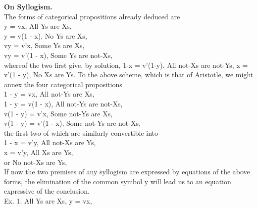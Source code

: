 \documentclass{article}
\begin{document}
{{{{\large{\bf On Syllogism.}\vspace{.1in}\\
\normalsize
The forms of categorical propositions already deduced are\vspace{.1in}\\
\hspace*{.2in}y = vx, All Ys are Xs,\\
\hspace*{.2in}y = v(1 - x), No Ys are Xs,\\
\hspace*{.2in}vy = v'x, Some Ys are Xs,\\
\hspace*{.2in}vy = v'(1 - x), Some Ys are not-Xs,\\
whereof the two first give, by solution, 1-x = v'(1-y). All not-Xs are not-Ys,
x = v'(1 - y), No Xs are Ys. To the above scheme, which is that of Aristotle,
we might annex the four categorical propositions\vspace{.1in}\\
\hspace*{.2in} 1 - y = vx, All not-Ys are Xs,\\
\hspace*{.2in} 1 - y = v(1 - x), All not-Ys are not-Xs,\\
\hspace*{.2in} v(1 - y) = v'x, Some not-Ys are Xs,\\
\hspace*{.2in} v(1 - y) = v'(1 - x), Some not-Ys are not-Xs,\\
the first two of which are similarly convertible into\vspace{.1in}\\
\hspace*{.2in} 1 - x = v'y, All not-Xs are Ys,\\
\hspace*{.2in}x = v'y, All Xs are Ys,\\
\hspace*{.5in}or No not-Xs are Ys,\vspace{.1in}\\
\hspace*{.1in}If now the two premises of any syllogism are expressed by equations of the
above forms, the elimination of the common symbol y will lead us to an equation
expressive of the conclusion.\vspace{.1in}\\
\hspace*{.2in} Ex. 1. All Ys are Xs, y = vx,\\
}}}}
\end{document}
